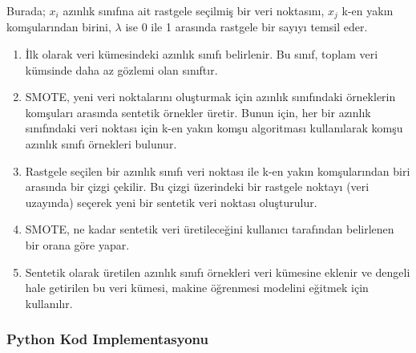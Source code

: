 Burada; $x_i$ azınlık sınıfına ait rastgele seçilmiş bir veri noktasını, $x_j$ k-en yakın komşularından birini, $\lambda$ ise 0 ile 1 arasında rastgele bir sayıyı temsil eder.

\begin{enumerate}
    \item İlk olarak veri kümesindeki azınlık sınıfı belirlenir. Bu sınıf, toplam veri kümsinde daha az gözlemi olan sınıftır.
    \item SMOTE, yeni veri noktalarını oluşturmak için azınlık sınıfındaki örneklerin komşuları arasında sentetik örnekler üretir. Bunun için, her bir azınlık sınıfındaki veri noktası için k-en yakın komşu algoritması kullanılarak komşu azınlık sınıfı örnekleri bulunur.
    \item Rastgele seçilen bir azınlık sınıfı veri noktası ile k-en yakın komşularından biri arasında bir çizgi çekilir. Bu çizgi üzerindeki bir rastgele noktayı (veri uzayında) seçerek yeni bir sentetik veri noktası oluşturulur. 
    \item SMOTE, ne kadar sentetik veri üretileceğini kullanıcı tarafından belirlenen bir orana göre yapar.
    \item Sentetik olarak üretilen azınlık sınıfı örnekleri veri kümesine eklenir ve dengeli hale getirilen bu veri kümesi, makine öğrenmesi modelini eğitmek için kullanılır.
\end{enumerate}

\subsubsection{Python Kod Implementasyonu}

